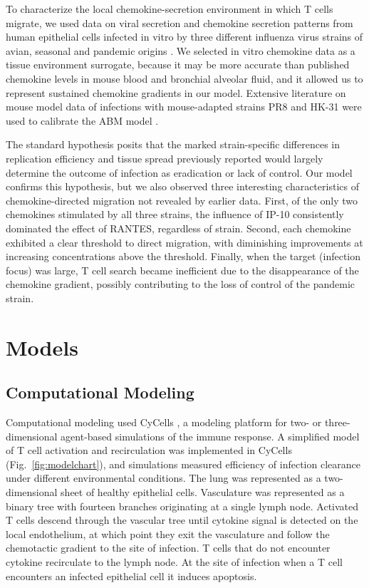 \documentclass[10pt]{article}
\begin{document}
To characterize the local chemokine-secretion environment in which T cells migrate, we used data on viral secretion and chemokine secretion patterns from human epithelial cells infected in vitro by three different influenza virus strains of avian, seasonal and pandemic origins \cite{Mitchell2011}.   We selected in vitro chemokine data as a tissue environment surrogate, because it may be more accurate than published chemokine levels in mouse blood and bronchial alveolar fluid, and it allowed us to represent sustained chemokine gradients in our model.  Extensive literature on mouse model data of infections with mouse-adapted strains PR8 and HK-31 were used to calibrate the ABM model \cite{Miao2010, Ganusov2011}.

The standard hypothesis posits that the marked strain-specific differences in replication efficiency and tissue spread previously reported \cite{Mitchell2011} would largely determine the outcome of infection as eradication or lack of control.  Our model confirms this hypothesis, but we also observed three interesting characteristics of chemokine-directed migration not revealed by earlier data.  First, of the only two chemokines stimulated by all three strains, the influence of IP-10 consistently dominated the effect of RANTES, regardless of strain.  Second, each chemokine exhibited a clear threshold to direct migration, with diminishing improvements at increasing concentrations above the threshold.  Finally, when the target (infection focus) was large, T cell search became inefficient due to the disappearance of the chemokine gradient, possibly contributing to the loss of control of the pandemic strain.  

\section*{Models}


\subsection*{Computational Modeling}


Computational modeling used CyCells \cite{Warrender2006}, a modeling platform for two- or three-dimensional agent-based simulations of the immune response. A simplified model of T cell activation and recirculation was implemented in CyCells (Fig.~\ref{fig:modelchart}), and simulations measured efficiency of infection clearance under different environmental conditions. The lung was represented as a two-dimensional sheet of healthy epithelial cells. Vasculature was represented as a binary tree with fourteen branches originating at a single lymph node. Activated T cells descend through the vascular tree until cytokine signal is detected on the local endothelium, at which point they exit the vasculature and follow the chemotactic gradient to the site of infection. T cells that do not encounter cytokine recirculate to the lymph node. At the site of infection when a T cell encounters an infected epithelial cell it induces apoptosis.
\end{document}

